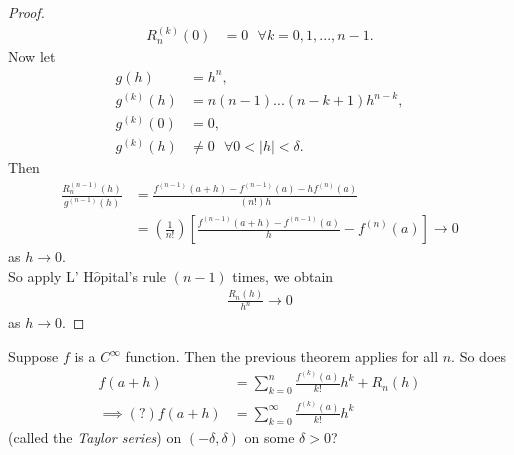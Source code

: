 \documentclass[a4paper]{article}
\begin{document}
\begin{thm}
\begin{proof}
\begin{equation*}
\begin{aligned}
R_n^{\left(k\right)}\left(0\right) &= 0 \text{  }\forall k=0,1,...,n-1.
\end{aligned}
\end{equation*}
Now let
\begin{equation*}
\begin{aligned}
g\left(h\right)&=h^n,\\
g^{\left(k\right)}\left(h\right)&=n\left(n-1\right)...\left(n-k+1\right)h^{n-k},\\
g^{\left(k\right)}\left(0\right)&=0,\\
g^{\left(k\right)}\left(h\right)&\neq 0 \text{  }\forall 0<|h|<\delta.
\end{aligned}
\end{equation*}
Then
\begin{equation*}
\begin{aligned}
\frac{R_n^{\left(n-1\right)}\left(h\right)}{g^{\left(n-1\right)}\left(h\right)} &= \frac{f^{\left(n-1\right)}\left(a+h\right)-f^{\left(n-1\right)}\left(a\right)-hf^{\left(n\right)}\left(a\right)}{\left(n!\right)h}\\
&= \left(\frac{1}{n!}\right) \left[\frac{f^{\left(n-1\right)}\left(a+h\right)-f^{\left(n-1\right)}\left(a\right)}{h}-f^{\left(n\right)}\left(a\right)\right] \to 0
\end{aligned}
\end{equation*}
as $h\to 0$.\\
So apply L' H$\hat{o}$pital's rule $\left(n-1\right)$ times, we obtain
\begin{equation*}
\begin{aligned}
\frac{R_n\left(h\right)}{h^n}\to 0
\end{aligned}
\end{equation*}
as $h\to 0$.
\end{proof}
\end{thm}

Suppose $f$ is a $C^\infty$ function. Then the previous theorem applies for all $n$. So does
\begin{equation*}
\begin{aligned}
f\left(a+h\right) &= \sum_{k=0}^n \frac{f^{\left(k\right)}\left(a\right)}{k!}h^k + R_n\left(h\right)\\
\implies(?) f\left(a+h\right)&= \sum_{k=0}^\infty \frac{f^{\left(k\right)}\left(a\right)}{k!}h^k
\end{aligned}
\end{equation*}
(called the \emph{Taylor series}) on $\left(-\delta,\delta\right)$ on some $\delta >0$?
\end{document}
